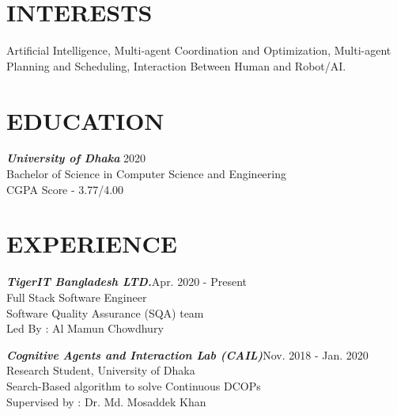 \documentclass[margin, 10pt]{res} %
\begin{document}
\begin{resume}

 
\section{INTERESTS}  
Artificial Intelligence, Multi-agent Coordination and Optimization, Multi-agent Planning and Scheduling, Interaction Between Human and Robot/AI.

\section{EDUCATION} 
{\sl \bf{University of Dhaka}} \hfill 2020 \\ Bachelor of Science in Computer Science and Engineering \\
CGPA Score - 3.77/4.00




\section{EXPERIENCE}
{\sl \bf{TigerIT Bangladesh LTD.}}\hfill Apr. 2020 - Present\\
Full Stack Software Engineer \\
Software Quality Assurance (SQA) team \\
Led By : Al Mamun Chowdhury

{\sl \bf{Cognitive Agents and Interaction Lab (CAIL)}}\hfill Nov. 2018 - Jan. 2020\\
Research Student, University of Dhaka \\
Search-Based algorithm to solve Continuous DCOPs \\
Supervised by : Dr. Md. Mosaddek Khan


\end{resume}
\end{document}
